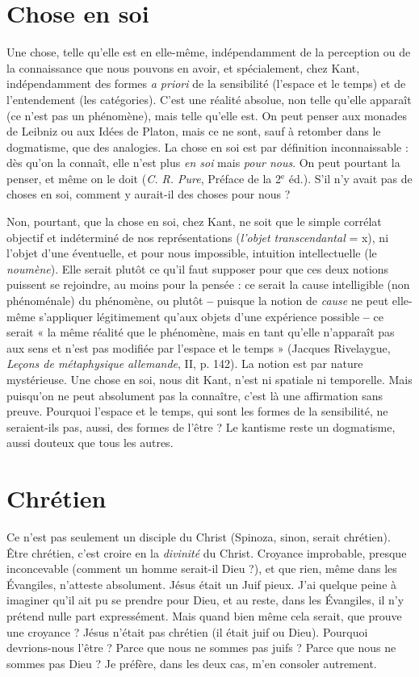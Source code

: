 \section{Chose en soi}
Une chose, telle qu’elle est en elle-même, indépendamment
de la perception ou de la connaissance que nous
pouvons en avoir, et spécialement, chez Kant, indépendamment des formes
{\it a priori} de la sensibilité (l’espace et le temps) et de l’entendement (les catégories).
C’est une réalité absolue, non telle qu’elle apparaît (ce n’est pas un phénomène),
mais telle qu’elle est. On peut penser aux monades de Leibniz ou aux
Idées de Platon, mais ce ne sont, sauf à retomber dans le dogmatisme, que des
analogies. La chose en soi est par définition inconnaissable : dès qu’on la
connaît, elle n’est plus {\it en soi} mais {\it pour nous}. On peut pourtant la penser, et
même on le doit ({\it C. R. Pure}, Préface de la 2$^\text{e}$ éd.). S’il n’y avait pas de choses
en soi, comment y aurait-il des choses pour nous ?

Non, pourtant, que la chose en soi, chez Kant, ne soit que le simple corrélat
objectif et indéterminé de nos représentations ({\it l'objet transcendantal} = x), ni
l’objet d’une éventuelle, et pour nous impossible, intuition intellectuelle (le
{\it noumène}). Elle serait plutôt ce qu’il faut supposer pour que ces deux notions
puissent se rejoindre, au moins pour la pensée : ce serait la cause intelligible
(non phénoménale) du phénomène, ou plutôt {\bf --} puisque la notion de {\it cause} ne
peut elle-même s'appliquer légitimement qu’aux objets d’une expérience possible {\bf --}
ce serait « la même réalité que le phénomène, mais en tant qu’elle
n'apparaît pas aux sens et n’est pas modifiée par l’espace et le temps » (Jacques
Rivelaygue, {\it Leçons de métaphysique allemande}, II, p. 142). La notion est par
nature mystérieuse. Une chose en soi, nous dit Kant, n’est ni spatiale ni temporelle.
Mais puisqu'on ne peut absolument pas la connaître, c’est là une affirmation
sans preuve. Pourquoi l’espace et le temps, qui sont les formes de la
sensibilité, ne seraient-ils pas, aussi, des formes de l'être ? Le kantisme reste un
dogmatisme, aussi douteux que tous les autres.

\section{Chrétien}
Ce n’est pas seulement un disciple du Christ (Spinoza, sinon,
serait chrétien). Être chrétien, c’est croire en la {\it divinité} du
Christ. Croyance improbable, presque inconcevable (comment un homme
serait-il Dieu ?), et que rien, même dans les Évangiles, n’atteste absolument.
Jésus était un Juif pieux. J'ai quelque peine à imaginer qu’il ait pu se prendre
pour Dieu, et au reste, dans les Évangiles, il n’y prétend nulle part expressément.
Mais quand bien même cela serait, que prouve une croyance ?
Jésus n’était pas chrétien (il était juif ou Dieu). Pourquoi devrions-nous
l'être ? Parce que nous ne sommes pas juifs ? Parce que nous ne sommes pas
Dieu ? Je préfère, dans les deux cas, m’en consoler autrement.

